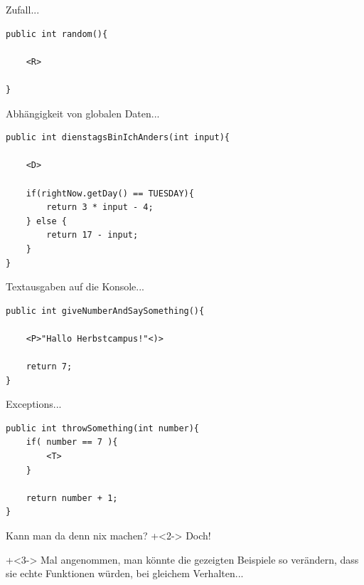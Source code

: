 \begin{frame}[fragile]{Zufall...}
\begin{lstlisting}
public int random(){

    <R>

}
\end{lstlisting}
\end{frame}

\begin{frame}[fragile]{Abhängigkeit von globalen Daten...}
\begin{lstlisting}
public int dienstagsBinIchAnders(int input){

    <D>

    if(rightNow.getDay() == TUESDAY){
        return 3 * input - 4;
    } else {
        return 17 - input;
    }
}
\end{lstlisting}
\end{frame}

\begin{frame}[fragile]{Textausgaben auf die Konsole...}
\begin{lstlisting}
public int giveNumberAndSaySomething(){

    <P>"Hallo Herbstcampus!"<)>
    
    return 7;
}
\end{lstlisting}
\end{frame}


\begin{frame}[fragile]{Exceptions...}
\begin{lstlisting}
public int throwSomething(int number){
    if( number == 7 ){
        <T>
    }
    
    return number + 1;
}
\end{lstlisting}
\end{frame}





\begin{frame}[fragile]{Kann man da denn nix machen?}
\onslide+<2->
Doch!

\vspace{1cm}

\onslide+<3->
Mal angenommen, man könnte die gezeigten Beispiele so verändern, dass sie echte Funktionen würden, bei gleichem Verhalten...

\end{frame}


